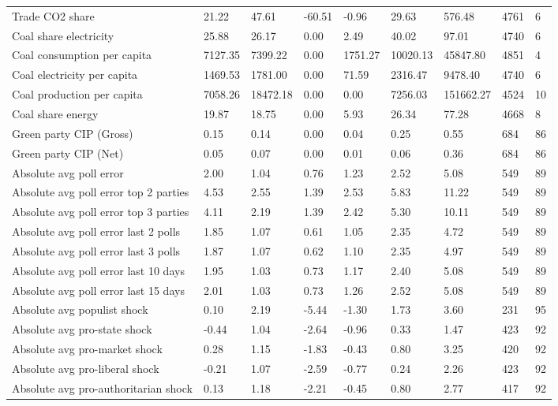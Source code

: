 \begin{longtable}{lllllllll}
Trade CO2 share & 21.22 & 47.61 & -60.51 & -0.96 & 29.63 & 576.48 & 4761 & 6\\
Coal share electricity & 25.88 & 26.17 & 0.00 & 2.49 & 40.02 & 97.01 & 4740 & 6\\
\addlinespace
Coal consumption per capita & 7127.35 & 7399.22 & 0.00 & 1751.27 & 10020.13 & 45847.80 & 4851 & 4\\
Coal electricity per capita & 1469.53 & 1781.00 & 0.00 & 71.59 & 2316.47 & 9478.40 & 4740 & 6\\
Coal production per capita & 7058.26 & 18472.18 & 0.00 & 0.00 & 7256.03 & 151662.27 & 4524 & 10\\
Coal share energy & 19.87 & 18.75 & 0.00 & 5.93 & 26.34 & 77.28 & 4668 & 8\\
Green party CIP (Gross) & 0.15 & 0.14 & 0.00 & 0.04 & 0.25 & 0.55 & 684 & 86\\
\addlinespace
Green party CIP (Net) & 0.05 & 0.07 & 0.00 & 0.01 & 0.06 & 0.36 & 684 & 86\\
Absolute avg poll error & 2.00 & 1.04 & 0.76 & 1.23 & 2.52 & 5.08 & 549 & 89\\
Absolute avg poll error top 2 parties & 4.53 & 2.55 & 1.39 & 2.53 & 5.83 & 11.22 & 549 & 89\\
Absolute avg poll error top 3 parties & 4.11 & 2.19 & 1.39 & 2.42 & 5.30 & 10.11 & 549 & 89\\
Absolute avg poll error last 2 polls & 1.85 & 1.07 & 0.61 & 1.05 & 2.35 & 4.72 & 549 & 89\\
\addlinespace
Absolute avg poll error last 3 polls & 1.87 & 1.07 & 0.62 & 1.10 & 2.35 & 4.97 & 549 & 89\\
Absolute avg poll error last 10 days & 1.95 & 1.03 & 0.73 & 1.17 & 2.40 & 5.08 & 549 & 89\\
Absolute avg poll error last 15 days & 2.01 & 1.03 & 0.73 & 1.26 & 2.52 & 5.08 & 549 & 89\\
Absolute avg populist shock & 0.10 & 2.19 & -5.44 & -1.30 & 1.73 & 3.60 & 231 & 95\\
Absolute avg pro-state shock & -0.44 & 1.04 & -2.64 & -0.96 & 0.33 & 1.47 & 423 & 92\\
\addlinespace
Absolute avg pro-market shock & 0.28 & 1.15 & -1.83 & -0.43 & 0.80 & 3.25 & 420 & 92\\
Absolute avg pro-liberal shock & -0.21 & 1.07 & -2.59 & -0.77 & 0.24 & 2.26 & 423 & 92\\
Absolute avg pro-authoritarian shock & 0.13 & 1.18 & -2.21 & -0.45 & 0.80 & 2.77 & 417 & 92\\

\end{longtable}
